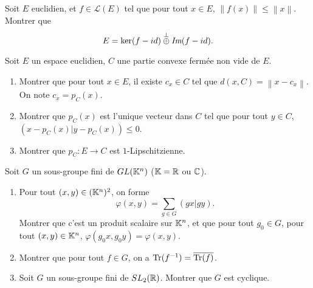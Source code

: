 \documentclass[12pt]{article}
\begin{document}
\begin{exercise}
	Soit $E$ euclidien, et $f\in\mathcal{L}(E)$ tel que pour tout $x\in E$, $\left\lVert f(x)\right\rVert\leqslant\left\lVert x\right\rVert$. Montrer que 
	\begin{equation}
		E=\ker(f-id)\overset{\perp}{\oplus}\emph{Im}(f-id).
	\end{equation}
\end{exercise}

\begin{exercise}
	Soit $E$ un espace euclidien, $C$ une partie convexe fermée non vide de $E$.
	\begin{enumerate}
		\item Montrer que pour tout $x\in E$, il existe $c_x\in C$ tel que $d(x,C)=\left\lVert x-c_x\right\rVert$. On note $c_x=p_{C}(x)$.
		\item Montrer que $p_{C}(x)$ est l'unique vecteur dans $C$ tel que pour tout $y\in C$, $(x-p_C(x)|y-p_C(x))\leqslant0$.
		\item Montrer que $p_C\colon E\to C$ est $1$-Lipschitzienne.
	\end{enumerate}
\end{exercise}

\begin{exercise}
	Soit $G$ un sous-groupe fini de $GL(\mathbb{K}^{n})$ ($\mathbb{K}=\mathbb{R}$ ou $\mathbb{C}$).
	\begin{enumerate}
		\item Pour tout $(x,y)\in(\mathbb{K}^{n})^{2}$, on forme 
		\begin{equation}
			\varphi(x,y)=\sum_{g\in G}(gx|gy).
		\end{equation}
		Montrer que c'est un produit scalaire sur $\mathbb{K}^{n}$, et que pour tout $g_0\in G$, pour tout $(x,y)\in \mathbb{K}^{n}$, $\varphi(g_0x,g_0y)=\varphi(x,y)$.
		\item Montrer que pour tout $f\in G$, on a $\operatorname{Tr}(f^{-1})=\overline{\operatorname{Tr}(f)}$.
		\item Soit $G$ un sous-groupe fini de $SL_{2}(\mathbb{R})$. Montrer que $G$ est cyclique.
	\end{enumerate}
\end{exercise}
\end{document}
